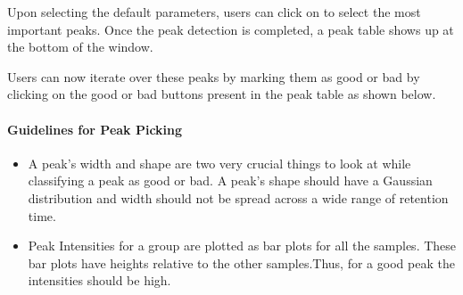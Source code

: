 \documentclass[letterpaper,10pt,english,openany,oneside]{sphinxmanual}
\begin{document}
Upon selecting the default parameters, users can click on  to select the most important peaks. Once the peak detection is completed, a peak table shows up at the bottom of the window.


Users can now iterate over these peaks by marking them as good or bad by clicking on the good or bad buttons present in the peak table as shown below.



\paragraph{Guidelines for Peak Picking}
\label{\detokenize{UnlabeledLCMSWorkflow:guidelines-for-peak-picking}}\begin{itemize}
\item {} 
A peak’s width and shape are two very crucial things to look at while classifying a peak as good or bad. A peak’s shape should have a Gaussian distribution and width should not be spread across a wide range of retention time.

\end{itemize}

\begin{itemize}
\item {} 
Peak Intensities for a group are plotted as bar plots for all the samples. These bar plots have heights relative to the other samples.Thus, for a good peak the intensities should be high.

\end{itemize}
\end{document}
